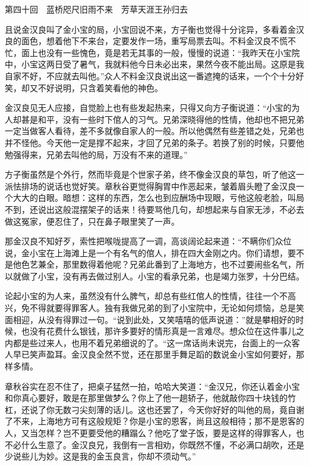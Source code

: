 \documentclass[12pt,UTF8]{ctexbook}
\begin{document}
{{{第四十回　蓝桥咫尺旧雨不来　芳草天涯王孙归去





且说金汉良叫了金小宝的局，小宝回说不来，方子衡也觉得十分诧异，多看着金汉良的面色，想着他下不来台，定要发作一场，重写局票去叫。不料金汉良不慌不忙，面上也没有一些愧色，竟是若无其事的一般，慢慢的说道：“我昨天在小宝院中，小宝这两日受了暑气，我就料他今日未必出来，果然今夜不能出局。这原是我自家不好，不应就去叫他。”众人不料金汉良说出这一番遮掩的话来，一个个十分好笑，却又不好说明，只含着笑看他的神色。

金汉良见无人应接，自觉脸上也有些发起热来，只得又向方子衡说道：“小宝的为人却甚是和平，没有一些时下倌人的习气。兄弟深晓得他的性情，他却也不把兄弟一定当做客人看待，差不多就像自家人的一般。所以他偶然有些差错之处，兄弟也并不怪他。今天他一定是撑不起来，才回了兄弟的条子。若换了别的时候，只要他勉强得来，兄弟去叫他的局，万没有不来的道理。”

方子衡虽然是个外行，然而毕竟是个世家子弟，终不像金汉良的草包，听了他这一派怯排场的说话也觉好笑。章秋谷更觉得胸胃中作恶起来，皱着眉头瞪了金汉良一个大大的白眼。暗想：这样的东西，怎么也到应酬场中现眼，亏他这般老脸，叫局不到，还说出这般混摆架子的话来！待要骂他几句，却想起来与自家无涉，不必去做这冤家，便忍住了，只在鼻子眼里笑了一声。

那金汉良不知好歹，索性把喉咙提高了一调，高谈阔论起来道：“不瞒你们众位说，金小宝在上海滩上是一个有名气的倌人，排在四大金刚之内。你们请想，要不是他色艺兼全，那里数得着他呢？兄弟此番到了上海地方，也不过要闹些名气，所以就做了小宝，没有再去做过别人。小宝的看承兄弟，也是竭力张罗，十分巴结。

论起小宝的为人来，虽然没有什么脾气，却总有些红倌人的性情，往往一个不高兴，免不得就要得罪客人。独有我做兄弟的到了小宝院中，无论如何烦恼，总是笑面相迎，从没有得罪过一句。“说到此处，又笑嘻嘻的低声说道：”就是攀相好的时候，也没有花费什么银钱，那许多要好的情形真是一言难尽。想众位在这件事儿之内都是些过来人，也用不着兄弟细说的了。“这一席话尚未说完，台面上的一众客人早已笑声盈耳。金汉良全然不觉，还在那里手舞足蹈的数说金小宝如何要好，那样多情。

章秋谷实在忍不住了，把桌子猛然一拍，哈哈大笑道：“金汉兄，你还认着金小宝和你真心要好，敢是在那里做梦么？你上了他一趟轿子，他就敲你四十块钱的竹杠，还说了你无数刁尖刻薄的话儿。这也还罢了，今天你好好的叫他的局，竟自谢了不来，上海地方可有这般规矩？你是小宝的恩客，尚且这般相待；那不是恩客的人，又当怎样？岂不更要受他的糟蹋么？他吃了堂子饭，要是这样的得罪客人，也不必什么生意了。金汉良兄，我倒有一言相劝，你既然不懂，不必满口胡吹，还是少说些儿为妙。这是我的金玉良言，你却不须动气。”

}}}
\end{document}
